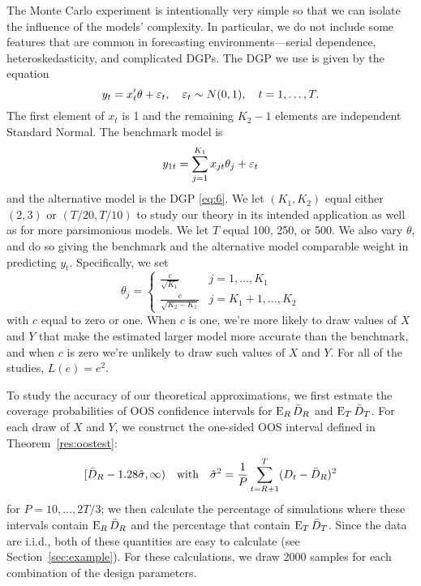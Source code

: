 \documentclass[12pt]{article}
\begin{document}
The Monte Carlo experiment is intentionally very simple so that we can
isolate the influence of the models' complexity.  In particular, we do
not include some features that are common in forecasting
environments---serial dependence, heteroskedasticity, and complicated
DGPs. The DGP we use is given by the equation
\begin{equation}\label{eq:6}
  y_t = x_t'\theta + \varepsilon_t,\quad \varepsilon_t \sim N(0,1),
  \quad t=1,\dots,T.
\end{equation}
The first element of $x_t$ is 1 and the remaining $K_2-1$ elements are
independent Standard Normal.  The benchmark model is
\begin{equation}
  \label{eq:1}
  y_{1t} = \sum_{j=1}^{K_1} x_{jt}\theta_j + \varepsilon_t
\end{equation}
and the alternative model is the DGP \eqref{eq:6}.  We let
$(K_1,K_2)$ equal either $(2,3)$ or $(T/20,T/10)$ to study our theory
in its intended application as well as for more parsimonious models.
We let $T$ equal 100, 250, or 500.  We also vary $\theta$, and do
so giving the benchmark and the alternative model comparable weight in
predicting $y_t$.  Specifically, we set
\begin{equation*}
  \theta_j =
\begin{cases} \frac{c}{\sqrt{K_1}} & j = 1,\dots,K_1 \\
\frac{c}{\sqrt{K_2 - K_1}} & j = K_1 + 1,\dots,K_2 \end{cases}
\end{equation*}
with $c$ equal to zero or one.  When $c$ is one, we're more likely to
draw values of $X$ and $Y$ that make the estimated larger model more
accurate than the benchmark, and when $c$ is zero we're unlikely to
draw such values of $X$ and $Y$.  For all of the studies, $L(e) =
e^2$.

To study the accuracy of our theoretical approximations, we first
estmate the coverage probabilities of OOS confidence intervals for
$\operatorname{E}_R \bar{D}_{R}$ and $\operatorname{E}_T \bar{D}_{T}$. For each draw of $X$ and $Y$, we
construct the one-sided OOS interval defined in
Theorem~\ref{res:oostest}:
\begin{equation*}
  [ \bar{D}_{R} - 1.28 \hat{\sigma}, \infty) \quad\text{with}\quad
  \hat{\sigma}^2 = \frac1P \sum_{t=R+1}^T (D_t - \bar{D}_{R})^{2}
\end{equation*}
for $P = 10,\dots,2T/3$; we then calculate the percentage of
simulations where these intervals contain $\operatorname{E}_R \bar{D}_{R}$ and the
percentage that contain $\operatorname{E}_T \bar{D}_{T}$.  Since the data are i.i.d., both
of these quantities are easy to calculate (see
Section~\ref{sec:example}). For these calculations, we draw 2000
samples for each combination of the design parameters.
\end{document}
